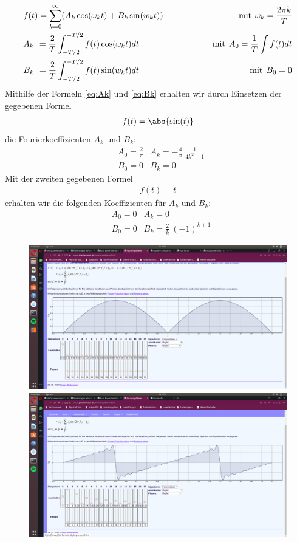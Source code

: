     \begin{align}   %
        &f(t) = \sum_{k=0}^{\infty} (A_k \cos\!{(\omega_kt)} + B_k \sin\!{(w_kt)}) \qquad \qquad &\text{mit} \:\: \omega_k = \frac{2\pi k}{T} \label{eq:frow}\\
        &A_k \hphantom{)} = \frac{2}{T} \int_{-T/2}^{+T/2} f(t) \cos\!{(\omega_kt)} dt \qquad \qquad &\text{mit} \:\: A_0 = \frac{1}{T} \int f(t)dt \label{eq:Ak}\\
        &B_k \hphantom{)} = \frac{2}{T} \int_{-T/2}^{+T/2} f(t) \sin\!{(w_kt)} dt \qquad \qquad \qquad \qquad \!\!&\text{mit} \:\: B_0 = 0 \label{eq:Bk}
    \end{align}
    Mithilfe der Formeln \eqref{eq:Ak} und \eqref{eq:Bk} erhalten wir durch Einsetzen der gegebenen Formel
    \begin{align}
        f(t) = \abs{\sin{\!(t)}} \label{eq:abs_sin} 
    \end{align}
    die Fourierkoeffizienten $A_k$ und $B_k$:
    \begin{align*}
        &A_0 = \frac{2}{\pi} &A_k = -\frac{4}{\pi}\:\frac{1}{4k^{2}-1}\\
        &B_0 = 0 &B_k = 0
    \end{align*}
    Mit der zweiten gegebenen Formel
    \begin{align}
        f(t) = t \label{eq:t}
    \end{align}
    erhalten wir die folgenden Koeffizienten für $A_k$ und $B_k$:
    \begin{align}
        &A_0 = 0 &A_k = 0\\
        &B_0 = 0 &B_k = \frac{2}{k}\:(-1)^{k+1}
    \end{align}
    \begin{figure}[h]   %
        \includegraphics[width=\textwidth]{abs_sinx_fourier}
        \includegraphics[width=\textwidth]{x_fourier}
    \end{figure}

